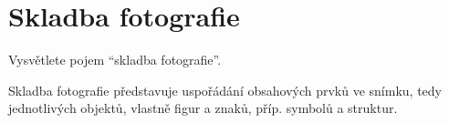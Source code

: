 \section{Skladba fotografie}
Vysvětlete pojem \enquote{skladba fotografie}.

Skladba fotografie představuje uspořádání obsahových prvků ve snímku, tedy jednotlivých objektů, vlastně figur a znaků, 
příp. symbolů a struktur.